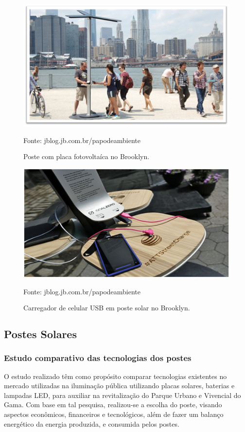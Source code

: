\begin{figure}[H]
	 \centering
	\label{Poste com placa fotovoltaíca}
	 \includegraphics[keepaspectratio=true,scale=0.8]{interacao/26.png}
	 \caption{Poste com placa fotovoltaíca no Brooklyn.}
	 \small{Fonte: jblog.jb.com.br/papodeambiente}
\end{figure}

\begin{figure}[H]
	 \centering
	\label{Carregador de celular USB em poste solar no Brooklyn}
	 \includegraphics[keepaspectratio=true,scale=0.8]{interacao/27.png}
	 \caption{Carregador de celular USB em poste solar no Brooklyn.}
	 \small{Fonte: jblog.jb.com.br/papodeambiente}
\end{figure}	

\subsection{Postes Solares}

\subsubsection{Estudo comparativo das tecnologias dos postes}
	O estudo realizado têm como propósito comparar tecnologias existentes no mercado utilizadas na iluminação pública utilizando placas solares, baterias e lampadas LED, para auxiliar na revitalização do Parque Urbano e Vivencial do Gama. Com base em tal pesquisa, realizou-se a escolha do poste, visando aspectos econômicos, financeiros e tecnológicos, além de fazer um balanço energético da energia produzida, e consumida pelos postes.

